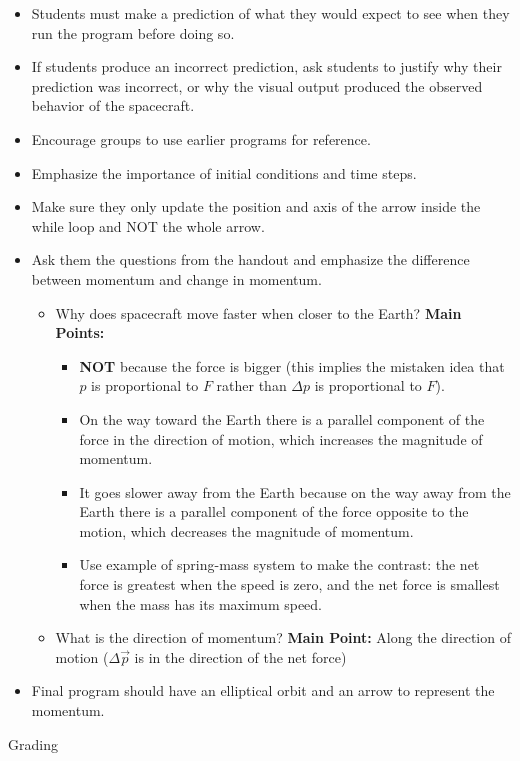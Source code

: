\documentclass[11pt]{article}
\begin{document}
\begin{noindent}
\begin{flushleft}
\begin{itemize}
\item Students must make a prediction of what they would expect to see when they run the program before doing so.
\item If students produce an incorrect prediction, ask students to justify why their prediction was incorrect, or why the visual output produced the observed behavior of the spacecraft.
\item Encourage groups to use earlier programs for reference.
\item Emphasize the importance of initial conditions and time steps.
\item Make sure they only update the position and axis of the arrow inside the while loop and NOT the whole arrow.
\item Ask them the questions from the handout and emphasize the difference between momentum and change in momentum.
\begin{itemize}
\item Why does spacecraft move faster when closer to the Earth?
\subitem \textbf{Main Points:}
\begin{itemize}
\item \textbf{NOT} because the force is bigger (this implies the mistaken idea that $p$ is proportional to $F$ rather than $\Delta p$ is proportional to $F$).
\item On the way toward the Earth there is a parallel component of the force in the direction of motion, which increases the magnitude of momentum.
\item It goes slower away from the Earth because on the way away from the Earth there is a parallel component of the force opposite to the motion, which decreases the magnitude of momentum.
\item Use example of spring-mass system to make the contrast: the net force is greatest when the speed is zero, and the net force is smallest when the mass has its maximum speed.
\end{itemize}
\item What is the direction of momentum?
\subitem \textbf{Main Point:} Along the direction of motion
\subitem ($\Delta \vec{p}$ is in the direction of the net force)
\end{itemize}
\item Final program should have an elliptical orbit and an arrow to represent the momentum.
\end{itemize}

\begin{description}
\item[Grading] 
\end{description}


\end{flushleft}
\end{noindent}
\end{document}
